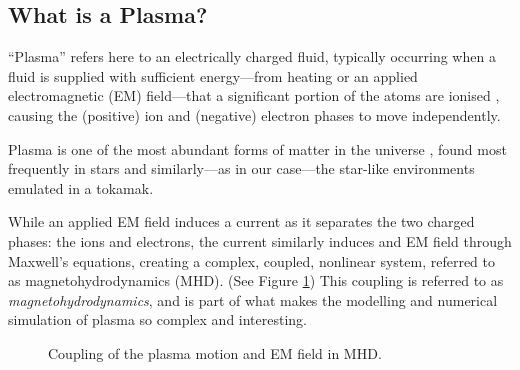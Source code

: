 \subsection*{What is a Plasma?}
    \begin{definition}[Plasma]
        ``Plasma'' refers here to an electrically charged fluid, typically occurring when a fluid is supplied with sufficient energy—from heating or an applied electromagnetic (EM) field—that a significant portion of the atoms  are ionised , causing the (positive) ion and (negative) electron phases to move independently.
    \end{definition}
    Plasma is one of the most abundant forms of matter in the universe \cite{CL13}, found most frequently in stars \cite{Phi95, Asc06, Pie17} and similarly—as in our case—the star-like environments emulated in a tokamak.
    
    While an applied EM field induces a current as it separates the two charged phases: the ions and electrons, the current similarly induces and EM field through Maxwell's equations, creating a complex, coupled, nonlinear system, referred to as magnetohydrodynamics (MHD). (See Figure \ref{fig:MHD coupling}) \BA{[Ref.]} This coupling is referred to as \emph{magnetohydrodynamics}, and is part of what makes the modelling and numerical simulation of plasma so complex and interesting.
    \begin{figure}[!h]
        \centering
        \caption{Coupling of the plasma motion and EM field in MHD.}
        \label{fig:MHD coupling}
    \end{figure}
    